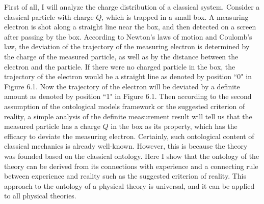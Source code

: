 First of all, I will analyze the charge distribution of a classical system. 
Consider a classical particle with charge $Q$, which is trapped in a small box. A measuring electron is shot along a straight line near the box, and then detected on a screen after passing by the box.  
According to Newton's laws of motion and Coulomb's law, the deviation of the trajectory of the measuring electron is determined by the charge of the measured particle, as well as by the distance between the electron and the particle. 
If there were no charged particle in the box, the trajectory of the electron would be a straight line as denoted by position ``0" in Figure 6.1.  
Now the trajectory of the electron will be deviated by a definite amount as denoted by position ``1" in Figure 6.1. %
Then according to the second assumption of the ontological models framework or the suggested criterion of reality, a simple analysis of the definite measurement result will tell us that the measured particle has a charge $Q$ in the box as its property, which has the efficacy to deviate the  measuring electron. Certainly, such ontological content of classical mechanics is already well-known.  However, this is because the theory was founded based on the classical ontology. Here I show that the ontology of the theory can be derived from its connections with experience and a connecting rule between experience and reality such as the suggested criterion of reality. This approach to the ontology of a physical theory is universal, and it can be applied to all physical theories.

